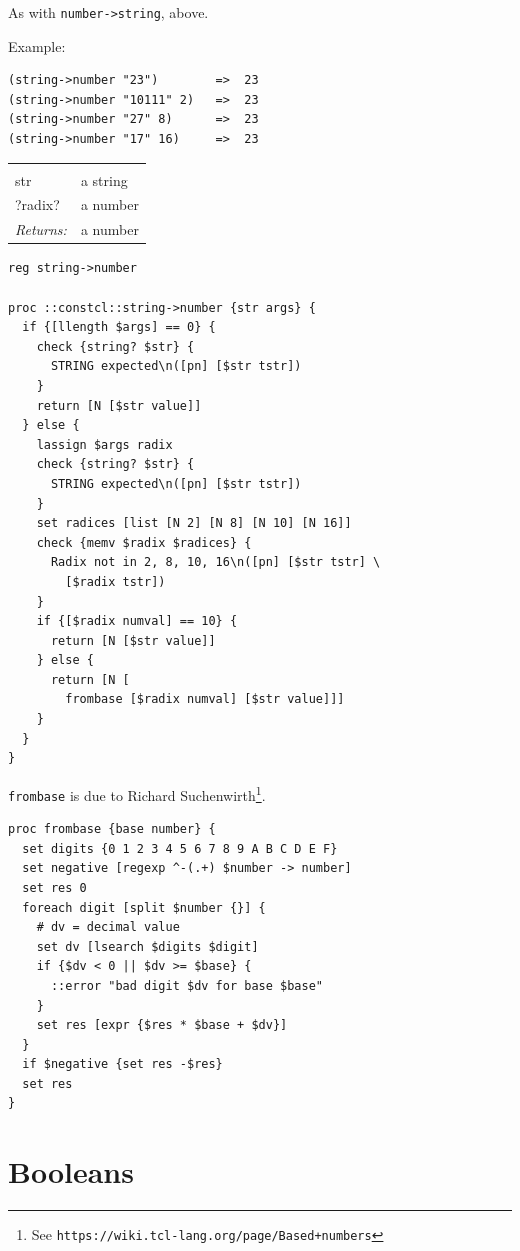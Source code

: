 \documentclass[a5paper,draft]{memoir}
\begin{document}
As with \texttt{number->string}, above.

Example:

\begin{verbatim}
(string->number "23")        =>  23
(string->number "10111" 2)   =>  23
(string->number "27" 8)      =>  23
(string->number "17" 16)     =>  23
\end{verbatim}

\noindent\begin{tabular}{ |p{1.9cm} p{6.5cm}| }
\hline
\rowcolor[HTML]{CCCCCC} \multicolumn{2}{|l|}{\textbf{string->number (public)}} \\
str & a string \\
?radix? & a number \\
\textit{Returns:} & a number \\
\hline
\end{tabular}

\begin{lstlisting}
reg string->number

proc ::constcl::string->number {str args} {
  if {[llength $args] == 0} {
    check {string? $str} {
      STRING expected\n([pn] [$str tstr])
    }
    return [N [$str value]]
  } else {
    lassign $args radix
    check {string? $str} {
      STRING expected\n([pn] [$str tstr])
    }
    set radices [list [N 2] [N 8] [N 10] [N 16]]
    check {memv $radix $radices} {
      Radix not in 2, 8, 10, 16\n([pn] [$str tstr] \
        [$radix tstr])
    }
    if {[$radix numval] == 10} {
      return [N [$str value]]
    } else {
      return [N [
        frombase [$radix numval] [$str value]]]
    }
  }
}
\end{lstlisting}

\texttt{frombase} is due to Richard Suchenwirth\footnote{See \texttt{https://wiki.tcl-lang.org/page/Based+numbers}}.
\index{frombase procedure}

\begin{lstlisting}
proc frombase {base number} {
  set digits {0 1 2 3 4 5 6 7 8 9 A B C D E F}
  set negative [regexp ^-(.+) $number -> number]
  set res 0
  foreach digit [split $number {}] {
    # dv = decimal value
    set dv [lsearch $digits $digit]
    if {$dv < 0 || $dv >= $base} {
      ::error "bad digit $dv for base $base"
    }
    set res [expr {$res * $base + $dv}]
  }
  if $negative {set res -$res}
  set res
}
\end{lstlisting}

\section{Booleans}
\label{booleans}
\end{document}
